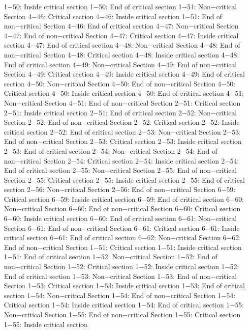1−50: Inside critical section
1−50: End of critical section
1−51: Non−critical Section
4−46: Critical section
4−46: Inside critical section
1−51: End of non−critical Section
4−46: End of critical section
4−47: Non−critical Section
4−47: End of non−critical Section
4−47: Critical section
4−47: Inside critical section
4−47: End of critical section
4−48: Non−critical Section
4−48: End of non−critical Section
4−48: Critical section
4−48: Inside critical section
4−48: End of critical section
4−49: Non−critical Section
4−49: End of non−critical Section
4−49: Critical section
4−49: Inside critical section
4−49: End of critical section
4−50: Non−critical Section
4−50: End of non−critical Section
4−50: Critical section
4−50: Inside critical section
4−50: End of critical section
4−51: Non−critical Section
4−51: End of non−critical Section
2−51: Critical section
2−51: Inside critical section
2−51: End of critical section
2−52: Non−critical Section
2−52: End of non−critical Section
2−52: Critical section
2−52: Inside critical section
2−52: End of critical section
2−53: Non−critical Section
2−53: End of non−critical Section
2−53: Critical section
2−53: Inside critical section
2−53: End of critical section
2−54: Non−critical Section
2−54: End of non−critical Section
2−54: Critical section
2−54: Inside critical section
2−54: End of critical section
2−55: Non−critical Section
2−55: End of non−critical Section
2−55: Critical section
2−55: Inside critical section
2−55: End of critical section
2−56: Non−critical Section
2−56: End of non−critical Section
6−59: Critical section
6−59: Inside critical section
6−59: End of critical section
6−60: Non−critical Section
6−60: End of non−critical Section
6−60: Critical section
6−60: Inside critical section
6−60: End of critical section
6−61: Non−critical Section
6−61: End of non−critical Section
6−61: Critical section
6−61: Inside critical section
6−61: End of critical section
6−62: Non−critical Section
6−62: End of non−critical Section
1−51: Critical section
1−51: Inside critical section
1−51: End of critical section
1−52: Non−critical Section
1−52: End of non−critical Section
1−52: Critical section
1−52: Inside critical section
1−52: End of critical section
1−53: Non−critical Section
1−53: End of non−critical Section
1−53: Critical section
1−53: Inside critical section
1−53: End of critical section
1−54: Non−critical Section
1−54: End of non−critical Section
1−54: Critical section
1−54: Inside critical section
1−54: End of critical section
1−55: Non−critical Section
1−55: End of non−critical Section
1−55: Critical section
1−55: Inside critical section
